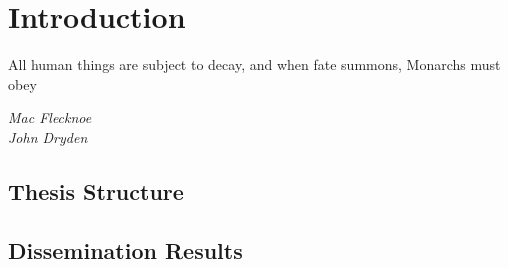 

\chapter{Introduction}
\label{chap:intro}

\epigraph{All human things are subject to decay, and when fate 
summons, Monarchs must obey}{\textit{Mac Flecknoe \\ John Dryden}}

\section{Thesis Structure}
\label{sec:thesisstructure}



\section{Dissemination Results}
\label{sec:disresults}



